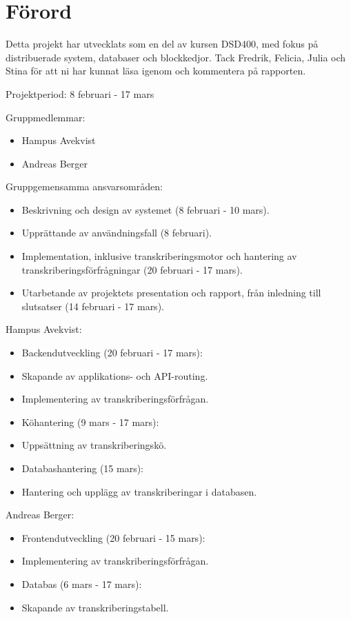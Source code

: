 \thispagestyle{plain}

\section{Förord}
Detta projekt har utvecklats som en del av kursen DSD400, med fokus på
distribuerade system, databaser och blockkedjor. Tack Fredrik, Felicia, Julia
och Stina för att ni har kunnat läsa igenom och kommentera på rapporten.

Projektperiod: 8 februari - 17 mars

Gruppmedlemmar:
\begin{itemize}
    \item Hampus Avekvist
    \item Andreas Berger
\end{itemize}

Gruppgemensamma ansvarsområden:
\begin{itemize}
    \item Beskrivning och design av systemet (8 februari - 10 mars).
    \item Upprättande av användningsfall (8 februari).
    \item Implementation, inklusive transkriberingsmotor och hantering av transkriberingsförfrågningar (20 februari - 17 mars).
    \item Utarbetande av projektets presentation och rapport, från inledning till slutsatser (14 februari - 17 mars).
\end{itemize}

Hampus Avekvist:
\begin{itemize}
    \item Backendutveckling (20 februari - 17 mars):
    \item Skapande av applikations- och API-routing.
    \item Implementering av transkriberingsförfrågan.
    \item Köhantering (9 mars - 17 mars):
    \item Uppsättning av transkriberingskö.
    \item Databashantering (15 mars):
    \item Hantering och upplägg av transkriberingar i databasen.
\end{itemize}

Andreas Berger:
\begin{itemize}
    \item Frontendutveckling (20 februari - 15 mars):
    \item Implementering av transkriberingsförfrågan.
    \item Databas (6 mars - 17 mars):
    \item Skapande av transkriberingstabell.
\end{itemize}
